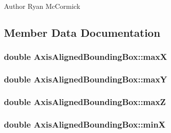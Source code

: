 \begin{DoxyAuthor}{Author}
Ryan Mc\-Cormick 
\end{DoxyAuthor}


\subsection{Member Data Documentation}
\hypertarget{structAxisAlignedBoundingBox_aefab04736fe96b24409238e74c1ed5f7}{
\subsubsection[{max\-X}]{\setlength{\rightskip}{0pt plus 5cm}double Axis\-Aligned\-Bounding\-Box\-::max\-X}}\label{structAxisAlignedBoundingBox_aefab04736fe96b24409238e74c1ed5f7}
\hypertarget{structAxisAlignedBoundingBox_a802025b881a796386f3a97f5b5ca3322}{
\subsubsection[{max\-Y}]{\setlength{\rightskip}{0pt plus 5cm}double Axis\-Aligned\-Bounding\-Box\-::max\-Y}}\label{structAxisAlignedBoundingBox_a802025b881a796386f3a97f5b5ca3322}
\hypertarget{structAxisAlignedBoundingBox_ac950610df58a2d1531f2e8859a688ede}{
\subsubsection[{max\-Z}]{\setlength{\rightskip}{0pt plus 5cm}double Axis\-Aligned\-Bounding\-Box\-::max\-Z}}\label{structAxisAlignedBoundingBox_ac950610df58a2d1531f2e8859a688ede}
\hypertarget{structAxisAlignedBoundingBox_ada87f37705b4e4c7309e8fa366cb6fbd}{
\subsubsection[{min\-X}]{\setlength{\rightskip}{0pt plus 5cm}double Axis\-Aligned\-Bounding\-Box\-::min\-X}}\label{structAxisAlignedBoundingBox_ada87f37705b4e4c7309e8fa366cb6fbd}
